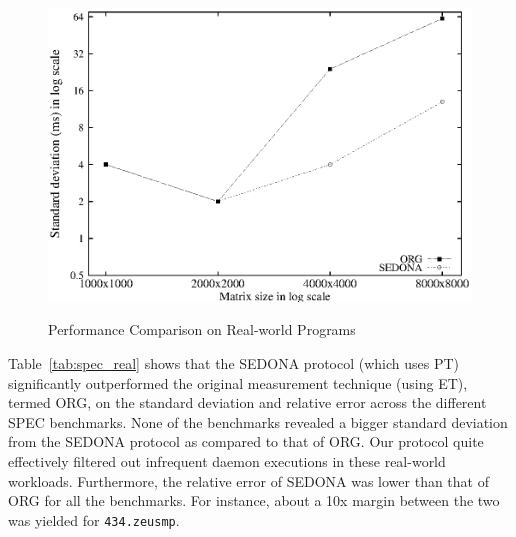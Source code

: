 \documentclass[letter]{ieice}
\begin{document}
{\begin{figure}[htp!]
{		\includegraphics[scale=0.31]{matc_std.eps}
		\label{fig:matc_std}
	}
	\vspace{-.1in}
	\caption{Performance Comparison on Real-world Programs~\label{fig:synprog_test}}
\vspace{-.2in}
\end{figure}
}

Table~\ref{tab:spec_real} shows that
the SEDONA protocol (which uses PT) significantly outperformed the original 
measurement technique (using ET), termed ORG, 
on the standard deviation and relative error across the different SPEC benchmarks. 
None of the benchmarks revealed a bigger standard deviation from the SEDONA protocol as compared to that of ORG. 
Our protocol quite effectively filtered out infrequent daemon executions 
in these real-world workloads. 
Furthermore, the relative error of SEDONA was 
lower than that of ORG for all the benchmarks. 
For instance, about a 10x \hbox{margin} between the two was yielded for 
{\tt 434.zeusmp}.
\end{document}
